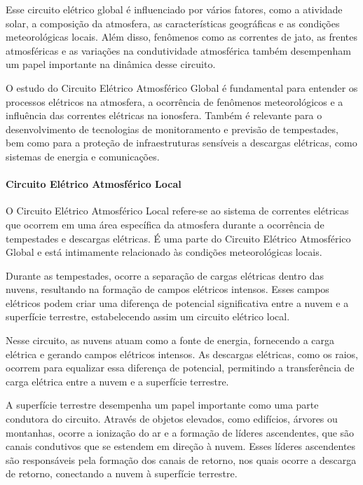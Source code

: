 \documentclass[a4paper, 12pt, onecolumn,singlespacing]{article}
\begin{document}
	Esse circuito elétrico global é influenciado por vários fatores, como a atividade solar, a composição da atmosfera, as características geográficas e as condições meteorológicas locais. Além disso, fenômenos como as correntes de jato, as frentes atmosféricas e as variações na condutividade atmosférica também desempenham um papel importante na dinâmica desse circuito.
	
	O estudo do Circuito Elétrico Atmosférico Global é fundamental para entender os processos elétricos na atmosfera, a ocorrência de fenômenos meteorológicos e a influência das correntes elétricas na ionosfera. Também é relevante para o desenvolvimento de tecnologias de monitoramento e previsão de tempestades, bem como para a proteção de infraestruturas sensíveis a descargas elétricas, como sistemas de energia e comunicações.
	
	\paragraph{Circuito Elétrico Atmosférico Local}
	
	O Circuito Elétrico Atmosférico Local refere-se ao sistema de correntes elétricas que ocorrem em uma área específica da atmosfera durante a ocorrência de tempestades e descargas elétricas. É uma parte do Circuito Elétrico Atmosférico Global e está intimamente relacionado às condições meteorológicas locais.
	
	Durante as tempestades, ocorre a separação de cargas elétricas dentro das nuvens, resultando na formação de campos elétricos intensos. Esses campos elétricos podem criar uma diferença de potencial significativa entre a nuvem e a superfície terrestre, estabelecendo assim um circuito elétrico local.
	
	Nesse circuito, as nuvens atuam como a fonte de energia, fornecendo a carga elétrica e gerando campos elétricos intensos. As descargas elétricas, como os raios, ocorrem para equalizar essa diferença de potencial, permitindo a transferência de carga elétrica entre a nuvem e a superfície terrestre.
	
	A superfície terrestre desempenha um papel importante como uma parte condutora do circuito. Através de objetos elevados, como edifícios, árvores ou montanhas, ocorre a ionização do ar e a formação de líderes ascendentes, que são canais condutivos que se estendem em direção à nuvem. Esses líderes ascendentes são responsáveis pela formação dos canais de retorno, nos quais ocorre a descarga de retorno, conectando a nuvem à superfície terrestre.
	
\end{document}
